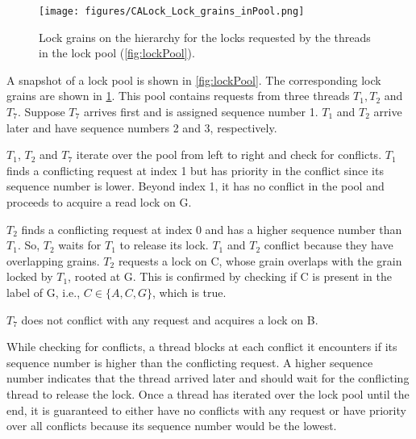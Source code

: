 \begin{figure}
	\centering
	\captionsetup{justification=centering}
	\texttt{[image: figures/CALock\_Lock\_grains\_inPool.png]}
	\caption{Lock grains on the hierarchy for the locks requested by the threads in the lock pool (\cref{fig:lockPool}).}
	\label{fig:lockGrainsOnHierarchy}
\end{figure}

A snapshot of a lock pool is shown in \cref{fig:lockPool}. The corresponding lock grains are shown in  \cref{fig:lockGrainsOnHierarchy}. This pool contains requests from three threads $T_1, T_2$ and $T_7$. Suppose $T_7$ arrives first and is assigned sequence number 1. $T_1$ and $T_2$ arrive later and have sequence numbers 2 and 3, respectively. 

$T_1$, $T_2$ and $T_7$ iterate over the pool from left to right and check for conflicts. $T_1$ finds a conflicting request at index 1 but has priority in the conflict since its sequence number is lower. Beyond index 1, it has no conflict in the pool and proceeds to acquire a read lock on G.

$T_2$ finds a conflicting request at index 0 and has a higher sequence number than $T_1$. So, $T_2$ waits for $T_1$ to release its lock. $T_1$ and $T_2$ conflict because they have overlapping grains. $T_2$ requests a lock on C, whose grain overlaps with the grain locked by $T_1$, rooted at G. This is confirmed by checking if C is present in the label of G, i.e., $C \in \{A, C, G\}$, which is true.

$T_7$ does not conflict with any request and acquires a lock on B.



While checking for conflicts, a thread blocks at each conflict it encounters if its sequence number is higher than the conflicting request. A higher sequence number indicates that the thread arrived later and should wait for the conflicting thread to release the lock. 
Once a thread has iterated over the lock pool until the end, it is guaranteed to either have no conflicts with any request or have priority over all conflicts because its sequence number would be the lowest. 




